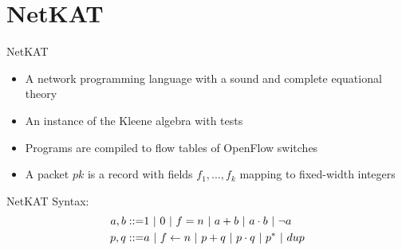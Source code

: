 \section{NetKAT}

\begin{frame}{NetKAT}
    \begin{itemize}
        \item A network programming language with a sound and complete
              equational theory
        \item An instance of the Kleene algebra with tests
        \item Programs are compiled to flow tables of OpenFlow switches
        \item A packet $pk$ is a record with fields $f_1,...,f_k$ 
    mapping to fixed-width integers 
    \end{itemize}
    \vspace{\baselineskip}
    NetKAT Syntax:
    \begin{align*}
        a,b ::= & 1 ~|~ 0 ~|~ f = n ~|~ a + b ~|~ a \cdot b ~|~ \neg a  \\
        p,q ::= & a ~|~ f \leftarrow n ~|~ p + q ~|~ p \cdot q ~|~ p^* ~|~ dup
    \end{align*}
\end{frame}

